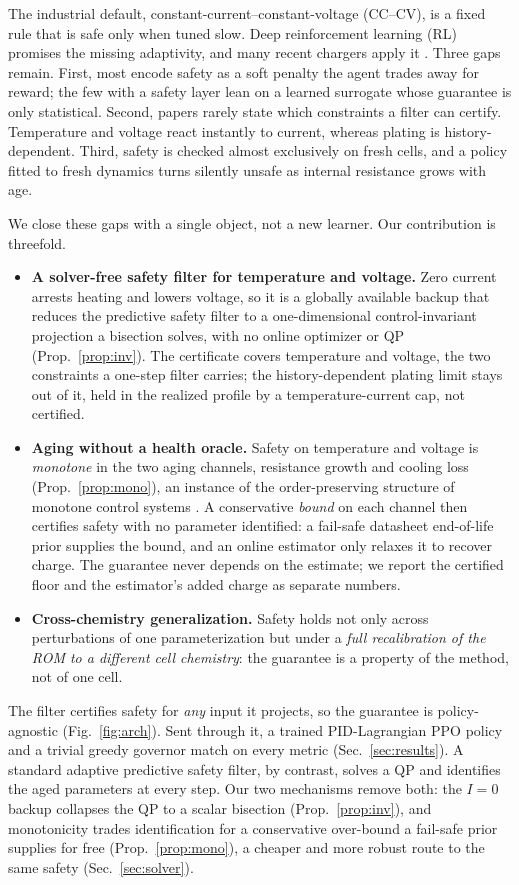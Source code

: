 \documentclass[conference]{IEEEtran}
\begin{document}
The industrial default, constant-current--constant-voltage (CC--CV), is a fixed rule that is safe only
when tuned slow. Deep reinforcement learning (RL) promises the missing adaptivity, and many recent
chargers apply it \cite{iecon2022penalty,cao2025adaptive,attia2020}. Three gaps remain. First, most
encode safety as a soft penalty the agent trades away for reward; the few with a safety layer lean on
a learned surrogate whose guarantee is only statistical. Second, papers rarely state which constraints
a filter can certify. Temperature and voltage react instantly to current, whereas plating is
history-dependent. Third, safety is checked almost exclusively on fresh cells, and a policy fitted to
fresh dynamics turns silently unsafe as internal resistance grows with age.

We close these gaps with a single object, not a new learner. Our
contribution is threefold.
\begin{itemize}
\item \textbf{A solver-free safety filter for temperature and voltage.} Zero current arrests heating
and lowers voltage, so it is a globally available backup that reduces the predictive safety filter
\cite{wabersich2021psf} to a one-dimensional control-invariant projection a bisection solves, with no
online optimizer or QP (Prop.~\ref{prop:inv}). The certificate covers temperature and voltage, the two
constraints a one-step filter carries; the history-dependent plating limit stays out of it, held in
the realized profile by a temperature-current cap, not certified.
\item \textbf{Aging without a health oracle.} Safety on temperature and voltage is \emph{monotone} in
the two aging channels, resistance growth and cooling loss (Prop.~\ref{prop:mono}), an instance of the
order-preserving structure of monotone control systems \cite{angeli2003monotone,coogan2015mixed}. A
conservative \emph{bound} on each channel then certifies safety with no parameter identified: a
fail-safe datasheet end-of-life prior supplies the bound, and an online estimator only relaxes it to
recover charge. The guarantee never depends on the estimate; we report the certified floor and the
estimator's added charge as separate numbers.
\item \textbf{Cross-chemistry generalization.} Safety holds not only across perturbations of one
parameterization but under a \emph{full recalibration of the ROM to a different cell chemistry}: the
guarantee is a property of the method, not of one cell.
\end{itemize}
The filter certifies safety for \emph{any} input it projects, so the guarantee is policy-agnostic
(Fig.~\ref{fig:arch}). Sent through it, a trained PID-Lagrangian PPO policy and a trivial greedy
governor match on every metric (Sec.~\ref{sec:results}). A standard
adaptive predictive safety filter, by contrast, solves a QP and identifies the aged parameters at
every step. Our two mechanisms remove both: the $I{=}0$ backup collapses the QP to a scalar bisection
(Prop.~\ref{prop:inv}), and monotonicity trades identification for a conservative over-bound a
fail-safe prior supplies for free (Prop.~\ref{prop:mono}), a cheaper and more robust route to the same
safety (Sec.~\ref{sec:solver}).
\end{document}
